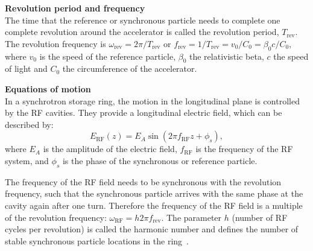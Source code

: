 

\textbf{Revolution period and frequency}\\
The time that the reference or synchronous particle needs to complete one complete revolution around the accelerator is called the revolution period, $T_\mathrm{rev}$. The revolution frequency is $\omega_\mathrm{rev} = 2\pi /T_\mathrm{rev}$ or $f_\mathrm{rev}=1/T_\mathrm{rev} =  v_0/C_0 = \beta_0 c/C_0$, where $v_0$ is the speed of the reference particle, $\beta_0$ the relativistic beta, $c$ the speed of light and $C_0$ the circumference of the accelerator.

\textbf{Equations of motion}\\ %
In a synchrotron storage ring, the motion in the longitudinal plane is controlled by the RF cavities. They provide a longitudinal electric field, which can be described by:
\begin{equation}\label{eq:RF_cavity_EF}
    E_\mathrm{{RF}}(z) = E_A \sin{(2\pi f_\mathrm{RF}z + \phi_s)},
\end{equation}
where $E_A$ is the amplitude of the electric field, $f_\mathrm{RF}$ is the frequency of the RF system, and $\phi_s$ is the phase of the synchronous or reference particle.

The frequency of the RF field needs to be synchronous with the revolution frequency, such that the synchronous particle arrives with the same phase at the cavity again after one turn. Therefore the frequency of the RF field is a multiple of the revolution frequency: $\omega_\mathrm{RF}=h 2\pi f_\mathrm{rev}$. The parameter $h$ (number of RF cycles per revolution) is called the harmonic number and defines the number of stable synchronous particle locations in the ring~\cite{Tecker:2674860}.


